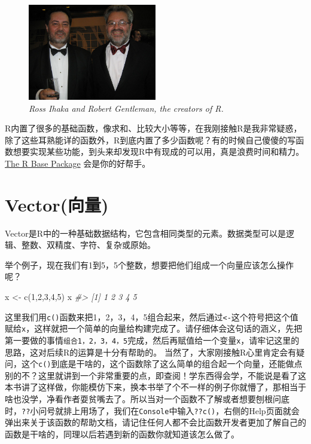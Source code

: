 \documentclass[
]{book}
\newenvironment{Shaded}{\begin{snugshade}}{\end{snugshade}}
\newcommand{\CommentTok}[1]{\textcolor[rgb]{0.56,0.35,0.01}{\textit{#1}}}
\newcommand{\DecValTok}[1]{\textcolor[rgb]{0.00,0.00,0.81}{#1}}
\newcommand{\FunctionTok}[1]{\textcolor[rgb]{0.00,0.00,0.00}{#1}}
\newcommand{\NormalTok}[1]{#1}
\newcommand{\OtherTok}[1]{\textcolor[rgb]{0.56,0.35,0.01}{#1}}
\begin{document}
\begin{figure}
\centering
\includegraphics[width=0.5\textwidth,height=\textheight]{images/creators.jpg}
\caption{\emph{Ross Ihaka and Robert Gentleman, the creators of R.}}
\end{figure}

R内置了很多的基础函数，像求和、比较大小等等，在我刚接触R是我非常疑惑，除了这些耳熟能详的函数外，R到底内置了多少函数呢？有的时候自己傻傻的写函数想要实现某些功能，到头来却发现R中有现成的可以用，真是浪费时间和精力。\href{https://stat.ethz.ch/R-manual/R-devel/library/base/html/00Index.html}{The R Base Package} 会是你的好帮手。

\hypertarget{vectorux5411ux91cf}{%
\section{Vector(向量)}\label{vectorux5411ux91cf}}

Vector是R中的一种基础数据结构，它包含相同类型的元素。数据类型可以是逻辑、整数、双精度、字符、复杂或原始。

举个例子，现在我们有1到5，5个整数，想要把他们组成一个向量应该怎么操作呢？

\begin{Shaded}
\begin{Highlighting}[]
\NormalTok{x }\OtherTok{\textless{}{-}} \FunctionTok{c}\NormalTok{(}\DecValTok{1}\NormalTok{,}\DecValTok{2}\NormalTok{,}\DecValTok{3}\NormalTok{,}\DecValTok{4}\NormalTok{,}\DecValTok{5}\NormalTok{)}
\NormalTok{x}
\CommentTok{\#\textgreater{} [1] 1 2 3 4 5}
\end{Highlighting}
\end{Shaded}

这里我们用\texttt{c()}函数来把1，2，3，4，5组合起来，然后通过\texttt{\textless{}-}这个符号把这个值赋给\texttt{x}，这样就把一个简单的向量给构建完成了。请仔细体会这句话的涵义，先把第一要做的事情\texttt{组合1，2，3，4，5}完成，然后再赋值给一个变量\texttt{x}，请牢记这里的思路，这对后续R的运算是十分有帮助的。
当然了，大家刚接触R心里肯定会有疑问，这个\texttt{c()}到底是干啥的，这个函数除了这么简单的组合起一个向量，还能做点别的不？这里就讲到一个非常重要的点，即查阅！学东西得会学，不能说是看了这本书讲了这样做，你能模仿下来，换本书举了个不一样的例子你就懵了，那相当于啥也没学，净看作者耍贫嘴去了。所以当对一个函数不了解或者想要刨根问底时，\texttt{??}小问号就排上用场了，我们在\texttt{Console}中输入\texttt{??c()}，右侧的Help页面就会弹出来关于该函数的帮助文档，请记住任何人都不会比函数开发者更加了解自己的函数是干啥的，同理以后若遇到新的函数你就知道该怎么做了。
\end{document}
